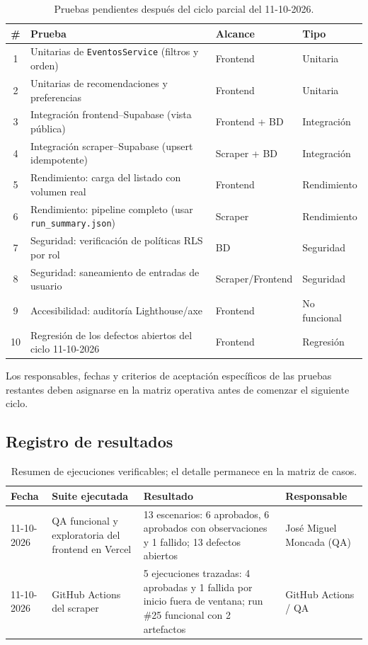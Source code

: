 {\small
\renewcommand{\arraystretch}{1.25}
\begin{longtable}{@{}c p{5.4cm} p{3.8cm} p{2.5cm}@{}}
\caption{Pruebas pendientes después del ciclo parcial del 11-10-2026.}
\label{tab:planpruebas}\\
\toprule
\textbf{\#} & \textbf{Prueba} & \textbf{Alcance} & \textbf{Tipo} \\
\midrule
1 & Unitarias de \texttt{EventosService} (filtros y orden) & Frontend & Unitaria \\
2 & Unitarias de recomendaciones y preferencias & Frontend & Unitaria \\
3 & Integración frontend--Supabase (vista pública) & Frontend + BD & Integración \\
4 & Integración scraper--Supabase (upsert idempotente) & Scraper + BD & Integración \\
5 & Rendimiento: carga del listado con volumen real & Frontend & Rendimiento \\
6 & Rendimiento: pipeline completo (usar \texttt{run\_summary.json}) & Scraper & Rendimiento \\
7 & Seguridad: verificación de políticas RLS por rol & BD & Seguridad \\
8 & Seguridad: saneamiento de entradas de usuario & Scraper/Frontend & Seguridad \\
9 & Accesibilidad: auditoría Lighthouse/axe & Frontend & No funcional \\
10 & Regresión de los defectos abiertos del ciclo 11-10-2026 & Frontend & Regresión \\
\bottomrule
\end{longtable}
}

Los responsables, fechas y criterios de aceptación específicos de las pruebas restantes
deben asignarse en la matriz operativa antes de comenzar el siguiente ciclo.

\subsection{Registro de resultados}

{\small
\renewcommand{\arraystretch}{1.2}
\begin{longtable}{@{}p{1.8cm} p{4.1cm} p{5.8cm} p{2.3cm}@{}}
\caption{Resumen de ejecuciones verificables; el detalle permanece en la matriz de casos.}
\label{tab:resultados}\\
\toprule
\textbf{Fecha} & \textbf{Suite ejecutada} & \textbf{Resultado} & \textbf{Responsable} \\
\midrule
11-10-2026 & QA funcional y exploratoria del frontend en Vercel & 13 escenarios: 6 aprobados, 6 aprobados con observaciones y 1 fallido; 13 defectos abiertos & José Miguel Moncada (QA) \\
11-10-2026 & GitHub Actions del scraper & 5 ejecuciones trazadas: 4 aprobadas y 1 fallida por inicio fuera de ventana; run \#25 funcional con 2 artefactos & GitHub Actions / QA \\
\bottomrule
\end{longtable}
}

